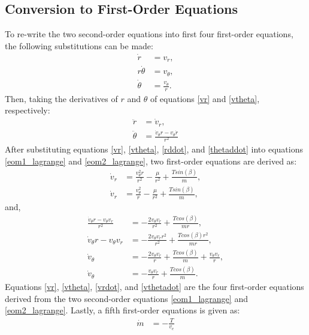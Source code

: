 \documentclass[]{article}
\begin{document}
\subsection{Conversion to First-Order Equations}
To re-write the two second-order equations into first four first-order equations, the following substitutions can be made:
\begin{align}
	\dot{r}       &= v_r,     \label{vr} \\
	r\dot{\theta} &= v_\theta,  \nonumber \\
	\dot{\theta}  &= \frac{v_\theta}{r}. \label{vtheta}
\end{align}
Then, taking the derivatives of \(r\) and \(\theta\) of equations \ref{vr} and \ref{vtheta}, respectively:
\begin{align}
	\ddot{r}      &= \dot{v}_r,  \label{rddot} \\
	\ddot{\theta} &= \frac{\dot{v}_{\theta}r - v_{\theta}\dot{r}}{r^2} \label{thetaddot}
\end{align}
After substituting equations \ref{vr}, \ref{vtheta}, \ref{rddot}, and \ref{thetaddot} into equations \ref{eom1_lagrange} and \ref{eom2_lagrange}, two first-order equations are derived as:
\begin{align}
    \dot{v}_r     &= \frac{v^2_{\theta}r}{r^2} - \frac{\mu}{r^2} + \frac{Tsin(\beta)}{m},                      \nonumber \\
    \dot{v}_r     &= \frac{v^2_{\theta}}{r} - \frac{\mu}{r^2} + \frac{Tsin(\beta)}{m},                        \label{vrdot}
\end{align}
and,
\begin{align}
	\frac{\dot{v}_{\theta}r - v_{\theta}v_r}{r^2} &= -\frac{2v_{\theta}v_r}{r^2}   + \frac{Tcos(\beta)}{mr},   \nonumber\\
	\dot{v}_{\theta}r - v_{\theta}v_r &= -\frac{2v_{\theta}v_{r}r^2}{r^2}   + \frac{Tcos(\beta)r^2}{mr},       \nonumber\\
	\dot{v}_\theta &= -\frac{2v_{\theta}v_{r}}{r}   + \frac{Tcos(\beta)}{m} + \frac{v_{\theta}v_r}{r},        \nonumber\\
	\dot{v}_\theta &= -\frac{v_{\theta}v_{r}}{r}   + \frac{Tcos(\beta)}{m} \label{vthetadot}.
\end{align}
Equations \ref{vr}, \ref{vtheta}, \ref{vrdot}, and \ref{vthetadot} are the four first-order equations derived from the two second-order equations \ref{eom1_lagrange} and \ref{eom2_lagrange}. Lastly, a fifth first-order equations is given as:
\begin{align}
	\dot{m} &= -\frac{T}{v_e} \label{massflowrate}
\end{align}
\end{document}
